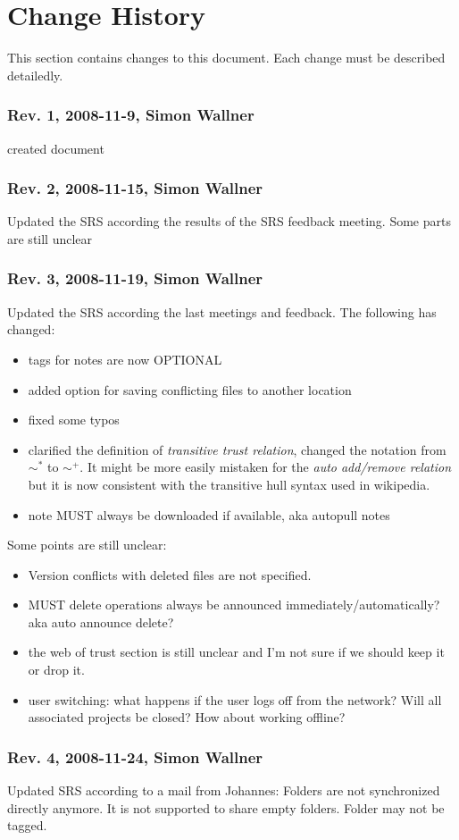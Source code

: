 \section{Change History}
This section contains changes to this document. Each change must be described detailedly.
\subsubsection{Rev. 1, 2008-11-9, Simon Wallner}
created document

\subsubsection{Rev. 2, 2008-11-15, Simon Wallner}
Updated the SRS according the results of the SRS feedback meeting. Some parts are still unclear

\subsubsection{Rev. 3, 2008-11-19, Simon Wallner}
Updated the SRS according the last meetings and feedback. The following has changed:

\begin{itemize}
\item tags for notes are now OPTIONAL
\item added option for saving conflicting files to another location
\item fixed some typos
\item clarified the definition of \emph{transitive trust relation}, changed the notation from $\sim ^*$ to $\sim ^+$. It might be more easily mistaken for the \emph{auto add/remove relation} but it is now consistent with the transitive hull syntax used in wikipedia.
\item note MUST always be downloaded if available, aka autopull notes
\end{itemize}
Some points are still unclear:
\begin{itemize}
\item Version conflicts with deleted files are not specified.
\item MUST delete operations always be announced immediately/automatically? aka auto announce delete?
\item the web of trust section is still unclear and I'm not sure if we should keep it or drop it.
\item user switching: what happens if the user logs off from the network? Will all associated projects be closed? How about working offline?
\end{itemize}


\subsubsection{Rev. 4, 2008-11-24, Simon Wallner}
Updated SRS according to a mail from Johannes: Folders are not synchronized directly anymore. It is not supported to share empty folders. Folder may not be tagged.




